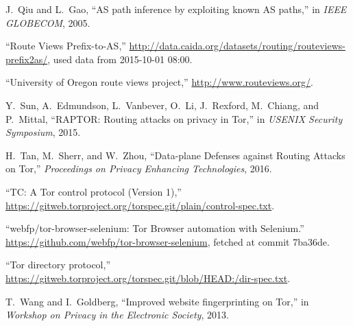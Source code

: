 \documentclass[conference]{styles/IEEEtran}
\begin{document}
{\begin{thebibliography}{10}
J.~Qiu and L.~Gao, ``{AS} path inference by exploiting known {AS} paths,'' in
  \emph{IEEE GLOBECOM}, 2005.

``{Route Views Prefix-to-AS},''
  \url{http://data.caida.org/datasets/routing/routeviews-prefix2as/}, used data
  from 2015-10-01 08:00.

``University of {O}regon route views project,''
  \url{http://www.routeviews.org/}.

Y.~Sun, A.~Edmundson, L.~Vanbever, O.~Li, J.~Rexford, M.~Chiang, and P.~Mittal,
  ``{RAPTOR}: Routing attacks on privacy in {T}or,'' in \emph{USENIX Security
  Symposium}, 2015.

H.~Tan, M.~Sherr, and W.~Zhou, ``{Data-plane Defenses against Routing Attacks
  on Tor},'' \emph{Proceedings on Privacy Enhancing Technologies}, 2016.

``{TC: A Tor control protocol (Version 1)},''
  \url{https://gitweb.torproject.org/torspec.git/plain/control-spec.txt}.

``{webfp/tor-browser-selenium: Tor Browser automation with Selenium.}''
  \url{https://github.com/webfp/tor-browser-selenium}, fetched at commit
  7ba36de.

``Tor directory protocol,''
  \url{https://gitweb.torproject.org/torspec.git/blob/HEAD:/dir-spec.txt}.

T.~Wang and I.~Goldberg, ``Improved website fingerprinting on {T}or,'' in
  \emph{Workshop on Privacy in the Electronic Society}, 2013.

\end{thebibliography}
 \else 

\fi

}
\end{document}
